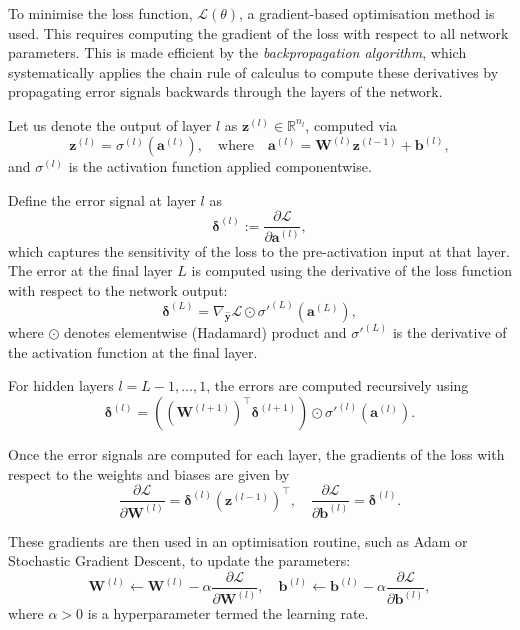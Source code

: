 To minimise the loss function, \( \mathcal{L}(\theta) \), a gradient-based optimisation method is 
used. This requires
computing the gradient of the loss with respect to all network parameters. This is made efficient by 
the \emph{backpropagation algorithm}, which systematically applies the chain rule of calculus to 
compute these derivatives by propagating error signals backwards through the layers of the network.

Let us denote the output of layer \( l \) as \( \mathbf{z}^{(l)} \in \mathbb{R}^{n_l} \), computed via
\[
    \mathbf{z}^{(l)} = \sigma^{(l)}\left( \mathbf{a}^{(l)} \right), \quad \text{where} \quad \mathbf{a}^{(l)} = \mathbf{W}^{(l)} \mathbf{z}^{(l-1)} + \mathbf{b}^{(l)},
\]
and \( \sigma^{(l)} \) is the activation function applied componentwise.

Define the error signal at layer \( l \) as
\[
    \boldsymbol{\delta}^{(l)} := \frac{\partial \mathcal{L}}{\partial \mathbf{a}^{(l)}},
\]
which captures the sensitivity of the loss to the pre-activation input at that layer. The error at the final layer \( L \) is computed using the derivative of the loss function with respect to the network output:
\[
    \boldsymbol{\delta}^{(L)} = \nabla_{\hat{\mathbf{y}}} \mathcal{L} \odot \sigma'^{(L)}\left( \mathbf{a}^{(L)} \right),
\]
where \( \odot \) denotes elementwise (Hadamard) product and \( \sigma'^{(L)} \) is the derivative of the activation function at the final layer.

For hidden layers \( l = L-1, \dots, 1 \), the errors are computed recursively using
\[
    \boldsymbol{\delta}^{(l)} = \left( (\mathbf{W}^{(l+1)})^\top \boldsymbol{\delta}^{(l+1)} \right) \odot \sigma'^{(l)}\left( \mathbf{a}^{(l)} \right).
\]

Once the error signals are computed for each layer, the gradients of the loss with respect to the weights and biases are given by
\[
    \frac{\partial \mathcal{L}}{\partial \mathbf{W}^{(l)}} = \boldsymbol{\delta}^{(l)} (\mathbf{z}^{(l-1)})^\top, \quad
    \frac{\partial \mathcal{L}}{\partial \mathbf{b}^{(l)}} = \boldsymbol{\delta}^{(l)}.
\]

These gradients are then used in an optimisation routine, such as Adam or Stochastic Gradient Descent,
to update the parameters:
\[
    \mathbf{W}^{(l)} \leftarrow \mathbf{W}^{(l)} - \alpha \frac{\partial \mathcal{L}}{\partial \mathbf{W}^{(l)}}, \quad
    \mathbf{b}^{(l)} \leftarrow \mathbf{b}^{(l)} - \alpha \frac{\partial \mathcal{L}}{\partial \mathbf{b}^{(l)}},
\]
where \( \alpha > 0 \) is a hyperparameter termed the learning rate.

